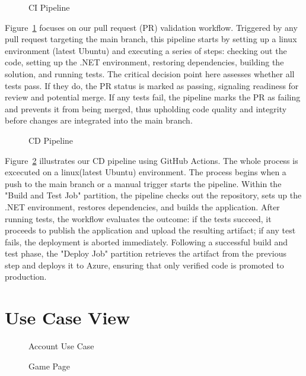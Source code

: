 \documentclass[11pt,a4paper]{article}
\newcommand{\inputdiagram}[1]{}
\newcommand{\textwidthdiagram}[2][1]{%
  \resizebox{#1\textwidth}{!}{\inputdiagram{#2}}%
}
\begin{document}
\begin{figure}[H]
        \centering
        \textwidthdiagram[0.8]{CI.tex}
        \caption{CI Pipeline}
        \label{fig:CI_pipeline}
\end{figure}
Figure~\ref{fig:CI_pipeline} focuses on our pull request (PR) validation
workflow. Triggered by any pull request targeting the main branch, this
pipeline starts by setting up a linux environment (latest Ubuntu) and
executing a series of steps: checking out the code, setting up the .NET
environment, restoring dependencies, building the solution, and running
tests. The critical decision point here assesses whether all tests pass. If
they do, the PR status is marked as passing, signaling readiness for review
and potential merge. If any tests fail, the pipeline marks the PR as failing
and prevents it from being merged, thus upholding code quality and integrity
before changes are integrated into the main branch.

\begin{figure}[H]
    \centering
    \textwidthdiagram[0.8]{CD.tex}
    \caption{CD Pipeline}
    \label{fig:CD_pipeline}
\end{figure}
Figure~\ref{fig:CD_pipeline} illustrates our CD pipeline using GitHub
Actions. The whole process is excecuted on a linux(latest Ubuntu)
environment. The process begins when a push to the main branch or a manual
trigger starts the pipeline. Within the "Build and Test Job" partition,
the pipeline checks out the repository, sets up the .NET environment,
restores dependencies, and builds the application. After running tests,
the workflow evaluates the outcome: if the tests succeed, it proceeds to
publish the application and upload the resulting artifact; if any test fails,
the deployment is aborted immediately. Following a successful build and test
phase, the "Deploy Job" partition retrieves the artifact from the previous
step and deploys it to Azure, ensuring that only verified code is promoted
to production.

\section{Use Case View}

\begin{figure}[H]
    \centering
    \begin{minipage}[b]{0.48\textwidth}
        \centering
        \textwidthdiagram{use_case_account.tex}
        \caption{Account Use Case}
        \label{fig:use_case_account}
    \end{minipage}
    \hfil
    \begin{minipage}[b]{0.48\textwidth}
        \centering
        \textwidthdiagram{use_case_game_page.tex}
        \caption{Game Page}
        \label{fig:use_case_game_page}
    \end{minipage}
\end{figure}
\end{document}
